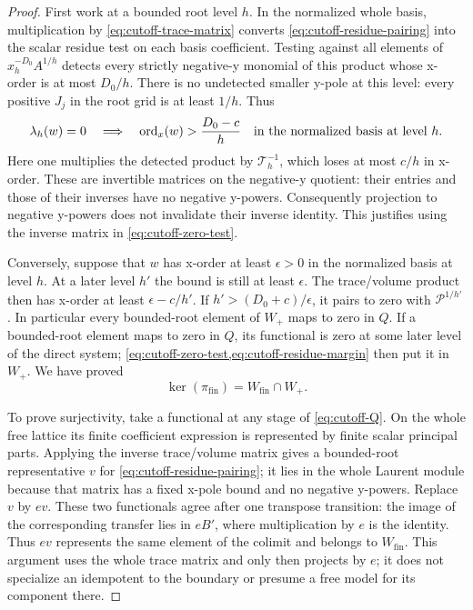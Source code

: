 \begin{proof}
First work at a bounded root level $h$.  In the normalized whole
basis, multiplication by \cref{eq:cutoff-trace-matrix} converts
\cref{eq:cutoff-residue-pairing} into the scalar residue test on each
basis coefficient.  Testing against all elements of
$x_h^{-D_0}A^{1/h}$ detects every strictly negative-y monomial of this
product whose x-order is at most $D_0/h$.  There is no undetected
smaller y-pole at this level: every positive $J_j$ in the root grid is
at least $1/h$.  Thus
\begin{equation}
 \lambda_h(w)=0
 \quad\Longrightarrow\quad
 \operatorname{ord}_x(w)>\frac{D_0-c}{h}
 \quad\text{in the normalized basis at level }h.
 \label{eq:cutoff-zero-test}
\end{equation}
Here one multiplies the detected product by $\mathcal T_h^{-1}$,
which loses at most $c/h$ in x-order.  These are invertible matrices
on the negative-y quotient: their entries and those of their inverses
have no negative y-powers.  Consequently projection to negative
y-powers does not invalidate their inverse identity.  This justifies
using the inverse matrix in \cref{eq:cutoff-zero-test}.

Conversely, suppose that $w$ has x-order at least $\epsilon>0$ in
the normalized basis at level $h$.  At a later level $h'$ the bound
is still at least $\epsilon$.  The trace/volume product then has
x-order at least $\epsilon-c/h'$.  If
$h'>(D_0+c)/\epsilon$, it pairs to zero with
$\mathcal P^{1/h'}$.  In particular every bounded-root element of
$W_+$ maps to zero in $Q$.  If a bounded-root element maps to zero in
$Q$, its functional is zero at some later level of the direct system;
\cref{eq:cutoff-zero-test,eq:cutoff-residue-margin} then put it in
$W_+$.  We have proved
\begin{equation}
 \ker(\pi_{\mathrm{fin}})=W_{\mathrm{fin}}\cap W_+.
 \label{eq:cutoff-finite-kernel}
\end{equation}

To prove surjectivity, take a functional at any stage of
\cref{eq:cutoff-Q}.  On the whole free lattice its finite coefficient
expression is represented by finite scalar principal parts.  Applying
the inverse trace/volume matrix gives a bounded-root representative
$v$ for \cref{eq:cutoff-residue-pairing}; it lies in the whole Laurent
module because that matrix has a fixed x-pole bound and no negative
y-powers.  Replace $v$ by $ev$.  These two functionals agree after one
transpose transition: the image of the corresponding transfer lies
in $eB'$, where multiplication by $e$ is the identity.  Thus $ev$
represents the same element of the colimit and belongs to
$W_{\mathrm{fin}}$.  This argument uses the whole trace matrix and
only then projects by $e$; it does not specialize an idempotent to
the boundary or presume a free model for its component there.


\end{proof}
